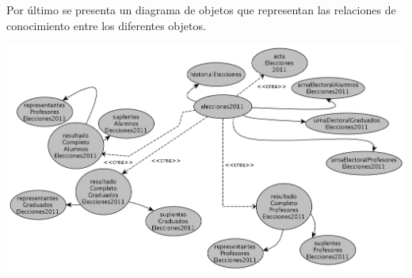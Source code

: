 Por \'ultimo se presenta un diagrama de objetos que representan las relaciones de conocimiento entre los diferentes objetos.

\begin{center}
\includegraphics[scale=0.25]{diagramas/modeloDeObjetosResultados.png}
\end{center}